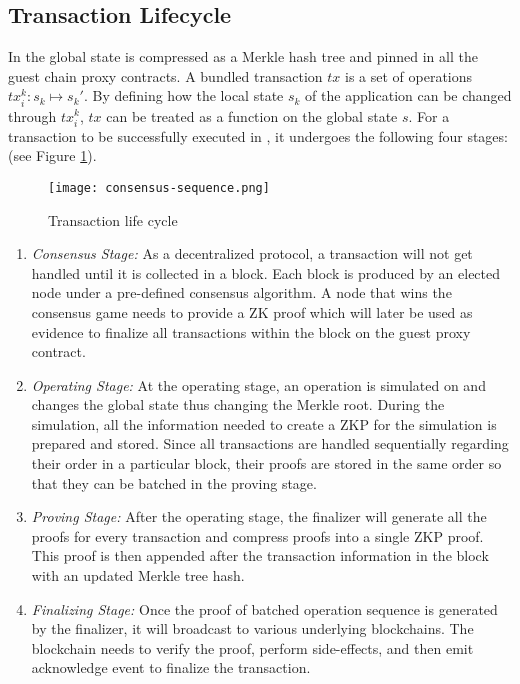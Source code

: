 \subsection{Transaction Lifecycle}
In \dprotocol the global state is compressed as a Merkle hash tree and pinned in all the guest chain proxy contracts. A bundled transaction $tx$ is a set of operations $tx_i^k: s_k \mapsto s_k'$. By defining how the local state $s_k$ of the application can be changed through $tx_i^k$, $tx$ can be treated as a function on the global state $s$. For a transaction to be successfully executed in \dprotocol, it undergoes the following four stages: (see Figure \ref{transaction-fifecycle}).
\begin{figure}[!ht]
\texttt{[image: consensus-sequence.png]}
\caption{Transaction life cycle}
\label{transaction-fifecycle}
\end{figure}
\begin{enumerate}[leftmargin=*]
\item \emph{Consensus Stage:} As a decentralized protocol, a transaction will not get handled until it is collected in a block. Each block is produced by an elected node under a pre-defined consensus algorithm. A node that wins the consensus game needs to provide a ZK proof which will later be used as evidence to finalize all transactions within the block on the guest proxy contract.

\item \emph{Operating Stage:} At the operating stage, an operation is simulated on \dprotocol and changes the global state thus changing the Merkle root. During the simulation, all the information needed to create a ZKP for the simulation is prepared and stored. Since all transactions are handled sequentially regarding their order in a particular block, their proofs are stored in the same order so that they can be batched in the proving stage. 

\item \emph{Proving Stage:} After the operating stage, the finalizer will generate all the proofs for every transaction and compress proofs into a single ZKP proof. This proof is then appended after the transaction information in the block with an updated Merkle tree hash. 
\item \emph{Finalizing Stage:} Once the proof of batched operation sequence is generated by the finalizer, it will broadcast to various underlying blockchains. The blockchain needs to verify the proof, perform side-effects, and then emit acknowledge event to finalize the transaction.
\end{enumerate}

